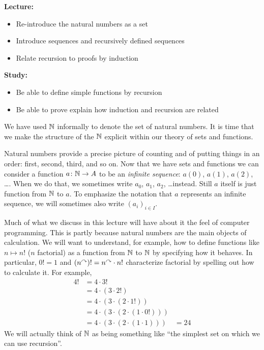 \begin{goals}
\noindent\textbf{Lecture:}
\begin{itemize}
	\item Re-introduce the natural numbers as a set
	\item Introduce sequences and recursively defined sequences
	\item Relate recursion to proofs by induction
\end{itemize}

\noindent\textbf{Study:}
\begin{itemize}
	\item Be able to define simple functions by recursion
	\item Be able to prove explain how induction and recursion are related
\end{itemize}
\end{goals}

We have used $\mathbb N$ informally to denote the set of natural numbers. 
It is time that we make the structure of the $\mathbb N$ explicit within our theory of sets and functions.

Natural numbers provide a precise picture of counting and of putting things in an order: first, second, third, and so on.
Now that we have sets and functions we can consider a function ${a}\colon{\mathbb N}\to{A}$ to be an \emph{infinite sequence}: $a(0)$, $a(1)$, $a(2)$, \ldots.
When we do that, we sometimes write $a_0$, $a_1$, $a_2$, \ldots instead. Still $a$ itself is just function from $\mathbb N$ to $a$. To emphasize the notation that 
$a$ represents an infinite sequence, we will sometimes also write $(a_i)_{i\in I}$.

Much of what we discuss in this lecture will have about it the feel of computer programming.
This is partly because natural numbers are the main objects of calculation.
We will want to understand, for example, how to define functions like $n\mapsto n!$ ($n$ factorial) as a function from $\mathbb N$ to $\mathbb N$ by specifying how it behaves.
In particular, $0! = 1$ and $(n^\curvearrowright)! = n^\curvearrowright\cdot n!$ characterize factorial by spelling out how to calculate it.
For example,
\begin{align*}
	4!  &= 4 \cdot 3! \\
		&= 4 \cdot (3 \cdot 2!)\\
		&= 4 \cdot (3 \cdot (2 \cdot 1!))\\
		&= 4 \cdot (3 \cdot (2 \cdot (1 \cdot 0!)))\\
		&= 4 \cdot (3 \cdot (2 \cdot (1 \cdot 1)))
		&= 24
\end{align*}
We will actually think of $\mathbb N$ as being something like ``the simplest set on which we can use recursion''.


